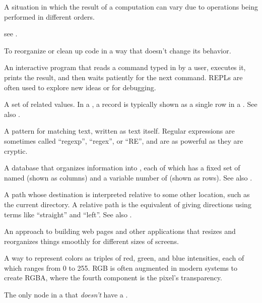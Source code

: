\begin{description}
A situation in which the result of a computation can vary due to operations
being performed in different orders.

see .

To reorganize or clean up code in a way that doesn't change its behavior.

An interactive program that reads a command typed in by a user, executes it,
prints the result, and then waits patiently for the next command. REPLs are
often used to explore new ideas or for debugging.

A set of related values. In a ,
a record is typically shown as a single row in a .
See also .

A pattern for matching text, written as text itself. Regular expressions
are sometimes called ``regexp'', ``regex'', or ``RE'', and are as powerful as
they are cryptic.

A database that organizes information into , each of which
has a fixed set of named  (shown as columns) and a variable
number of  (shown as rows). See also .

A path whose destination is interpreted relative to some other location, such
as the current directory. A relative path is the equivalent of giving
directions using terms like ``straight'' and ``left''. See also .

An approach to building web pages and other applications that resizes and
reorganizes things smoothly for different sizes of screens.

A way to represent colors as triples of red, green, and blue intensities, each
of which ranges from 0 to 255. RGB is often augmented in modern systems to
create RGBA, where the fourth component is the pixel's transparency.

The only node in a  that \emph{doesn't} have a .


\end{description}
